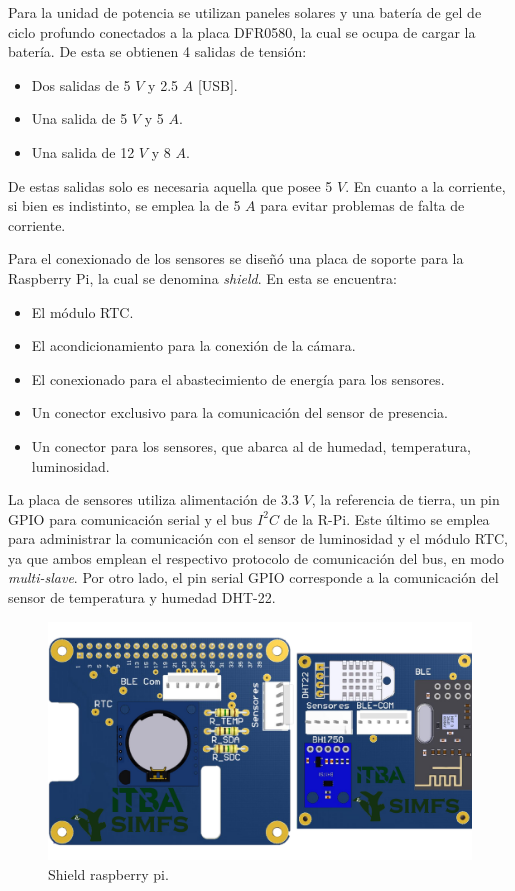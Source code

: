 
Para la unidad de potencia se utilizan paneles solares y una batería de gel de ciclo profundo conectados a la placa DFR0580, la cual se ocupa de cargar la batería. De esta se obtienen 4 salidas de tensión:
\begin{itemize}
	\item Dos salidas de 5 $V$ y 2.5 $A$ [USB].
	\item Una salida de 5 $V$ y 5 $A$.
	\item Una salida de 12 $V$ y 8 $A$.
\end{itemize}

De estas salidas solo es necesaria aquella que posee 5 $V$. En cuanto a la corriente, si bien es indistinto, se emplea la de 5 $A$ para evitar problemas de falta de corriente.

Para el conexionado de los sensores se diseñó una placa de soporte para la Raspberry Pi, la cual se denomina \textit{shield}. En esta se encuentra:
\begin{itemize}
	\item El módulo RTC.
	\item El acondicionamiento para la conexión de la cámara.
	\item El conexionado para el abastecimiento de energía para los sensores.
	\item Un conector exclusivo para la comunicación del sensor de presencia.
	\item Un conector para los sensores, que abarca al de humedad, temperatura, luminosidad.
\end{itemize}

La placa de sensores utiliza alimentación de 3.3 $V$, la referencia de tierra, un pin GPIO para comunicación serial y el bus $I^2C$ de la R-Pi. Este último se emplea para administrar la comunicación con el sensor de luminosidad y el módulo RTC, ya que ambos emplean el respectivo protocolo de comunicación del bus, en modo \textit{multi-slave}. Por otro lado, el pin serial GPIO corresponde a la comunicación del sensor de temperatura y humedad DHT-22. 
\begin{figure}[H]
	\centering
	\includegraphics[width=0.9\linewidth,page=1]{ImagenesIngenieria de Detalle/RPI}		
	\caption{Shield raspberry pi.}
	\label{fig:conexionado_Rpi}
\end{figure}

